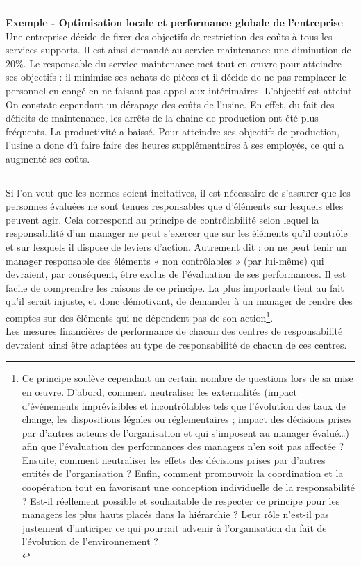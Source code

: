\documentclass{tufte-handout}
\begin{document}
\noindent\rule{\textwidth}{0.5pt}
\textbf{Exemple - Optimisation locale et performance globale de l’entreprise}\\
Une entreprise décide de fixer des objectifs de restriction des coûts à tous les services supports. Il est ainsi demandé au service maintenance une diminution de 20\%. Le responsable du service maintenance met tout en œuvre pour atteindre ses objectifs : il minimise ses achats de pièces et il décide de ne pas remplacer le personnel en congé en ne faisant pas appel aux intérimaires. L’objectif est atteint. On constate cependant un dérapage des coûts de l’usine. En effet, du fait des déficits de maintenance, les arrêts de la chaine de production ont été plus fréquents. La productivité a baissé. Pour atteindre ses objectifs de production, l’usine a donc dû faire faire des heures supplémentaires à ses employés, ce qui a augmenté ses coûts.\\

\noindent\rule{\textwidth}{0.5pt}

Si l’on veut que les normes soient incitatives, il est nécessaire de s’assurer que les personnes évaluées ne sont tenues responsables que d’éléments sur lesquels elles peuvent agir. Cela correspond au principe de contrôlabilité selon lequel la responsabilité d’un manager ne peut s’exercer que sur les éléments qu’il contrôle et sur lesquels il dispose de leviers d’action. Autrement dit : on ne peut tenir un manager responsable des éléments « non contrôlables » (par lui-même) qui devraient, par conséquent, être exclus de l’évaluation de ses performances. Il est facile de comprendre les raisons de ce principe. La plus importante tient au fait qu’il serait injuste, et donc démotivant, de demander à un manager de rendre des comptes sur des éléments qui ne dépendent pas de son action\footnote{Ce principe soulève cependant un certain nombre de questions lors de sa mise en œuvre. D'abord, comment neutraliser les externalités (impact d’événements imprévisibles et incontrôlables tels que l’évolution des taux de change, les dispositions légales ou réglementaires ; impact des décisions prises par d’autres acteurs de l’organisation et qui s’imposent au manager évalué…) afin que l’évaluation des performances des managers n’en soit pas affectée ? Ensuite, comment neutraliser les effets des décisions prises par d’autres entités de l’organisation ? Enfin, comment promouvoir la coordination et la coopération tout en favorisant une conception individuelle de la responsabilité ? Est-il réellement possible et souhaitable de respecter ce principe pour les managers les plus hauts placés dans la hiérarchie ? Leur rôle n’est-il pas justement d’anticiper ce qui pourrait advenir à l’organisation du fait de l’évolution de l’environnement ?\\}.\\
Les mesures financières de performance de chacun des centres de responsabilité devraient ainsi être adaptées au type de responsabilité de chacun de ces centres.\\
\end{document}
